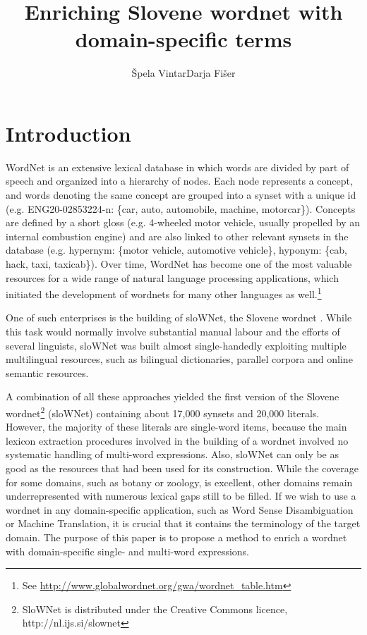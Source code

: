 \documentclass[output=paper]{LSP/langsci}
\author{Špela Vintar\lastand Darja Fišer\affiliation{Dept. of Translation, Faculty of Arts, University of Ljubljana}}
\title{Enriching Slovene wordnet with domain-specific terms}
\begin{document}


\section{Introduction}\label{sec:vintar:1}

WordNet \citep{Fellbaum1998} is an extensive lexical database in which words are divided by part of speech and organized into a hierarchy of nodes. Each node represents a concept, and words denoting the same concept are grouped into a synset with a unique id (e.g. ENG20-02853224-n: \{car, auto, automobile, machine, motorcar\}). Concepts are defined by a short gloss (e.g. 4-wheeled motor vehicle, usually propelled by an internal combustion engine) and are also linked to other relevant synsets in the database (e.g. hypernym: \{motor vehicle, automotive vehicle\}, hyponym: \{cab, hack, taxi, taxicab\}). Over time, WordNet has become one of the most valuable resources for a wide range of natural language processing applications, which initiated the development of wordnets for many other languages as well.\footnote{See \url{http://www.globalwordnet.org/gwa/wordnet_table.htm}}


One of such enterprises is the building of sloWNet, the Slovene wordnet \citep{Erjavec2006,Fišer2007,Fišer2008}. While this task would normally involve substantial manual labour and the efforts of several linguists, sloWNet was built almost single-handedly exploiting multiple multilingual resources, such as bilingual dictionaries, parallel corpora and online semantic resources. 

A combination of all these approaches yielded the first version of the Slovene wordnet\footnote{SloWNet is distributed under the Creative Commons licence, http://nl.ijs.si/slownet} (sloWNet) containing about 17,000 synsets and 20,000 literals. However, the majority of these literals are single-word items, because the main lexicon extraction procedures involved in the building of a wordnet involved no systematic handling of multi-word expressions. Also, sloWNet can only be as good as the resources that had been used for its construction. While the coverage for some domains, such as botany or zoology, is excellent, other domains remain underrepresented with numerous lexical gaps still to be filled. If we wish to use a wordnet in any domain-specific application, such as Word Sense Disambiguation or Machine Translation, it is crucial that it contains the terminology of the target domain. The purpose of this paper is to propose a method to enrich a wordnet with domain-specific single- and multi-word expressions. 
\end{document}
